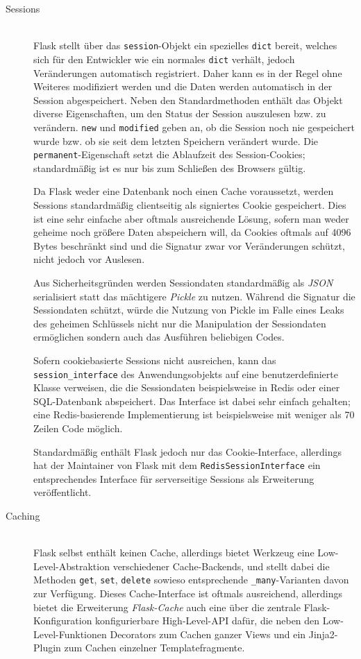 \begin{description}
\item[Sessions] \hfill \\
Flask stellt über das \lstinline{session}-Objekt ein spezielles \lstinline{dict} bereit, welches
sich für den Entwickler wie ein normales \lstinline{dict} verhält, jedoch Veränderungen automatisch
registriert. Daher kann es in der Regel ohne Weiteres modifiziert werden und die Daten werden
automatisch in der Session abgespeichert. Neben den Standardmethoden enthält das Objekt diverse
Eigenschaften, um den Status der Session auszulesen bzw. zu verändern. \lstinline{new} und
\lstinline{modified} geben an, ob die Session noch nie gespeichert wurde bzw. ob sie seit dem
letzten Speichern verändert wurde. Die \lstinline{permanent}-Eigenschaft setzt die Ablaufzeit des
Session-Cookies; standardmäßig ist es nur bis zum Schließen des Browsers gültig.

Da Flask weder eine Datenbank noch einen Cache voraussetzt, werden Sessions standardmäßig
clientseitig als signiertes Cookie gespeichert. Dies ist eine sehr einfache aber oftmals
ausreichende Lösung, sofern man weder geheime noch größere Daten abspeichern will, da Cookies
oftmals auf 4096 Bytes beschränkt sind und die Signatur zwar vor Veränderungen schützt, nicht jedoch
vor Auslesen.

Aus Sicherheitsgründen werden Sessiondaten standardmäßig als \emph{JSON} serialisiert statt das
mächtigere \emph{Pickle} zu nutzen. Während die Signatur die Sessiondaten schützt, würde die Nutzung
von Pickle im Falle eines Leaks des geheimen Schlüssels nicht nur die Manipulation der Sessiondaten
ermöglichen sondern auch das Ausführen beliebigen Codes.

Sofern cookiebasierte Sessions nicht ausreichen, kann das \lstinline{session_interface} des
Anwendungsobjekts auf eine benutzerdefinierte Klasse verweisen, die die Sessiondaten beispielsweise
in Redis oder einer SQL-Datenbank abspeichert. Das Interface ist dabei sehr einfach gehalten; eine
Redis-basierende Implementierung ist beispielsweise mit weniger als 70 Zeilen Code möglich.

Standardmäßig enthält Flask jedoch nur das Cookie-Interface, allerdings hat der Maintainer von Flask
mit dem \lstinline{RedisSessionInterface} ein entsprechendes Interface für serverseitige Sessions
als Erweiterung veröffentlicht.


\item[Caching] \hfill \\
Flask selbst enthält keinen Cache, allerdings bietet Werkzeug eine Low-Level-Abstraktion
verschiedener Cache-Backends, und stellt dabei die Methoden \lstinline{get}, \lstinline{set},
\lstinline{delete} sowieso entsprechende \lstinline{_many}-Varianten davon zur Verfügung. Dieses
Cache-Interface ist oftmals ausreichend, allerdings bietet die Erweiterung \emph{Flask-Cache} auch
eine über die zentrale Flask-Konfiguration konfigurierbare High-Level-API dafür, die neben den
Low-Level-Funktionen Decorators zum Cachen ganzer Views und ein Jinja2-Plugin zum Cachen einzelner
Templatefragmente.


\end{description}
